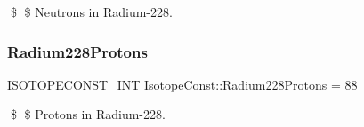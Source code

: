 \$ \$ Neutrons in Radium-\/228. \mbox{\label{group___isotope_const-_radium-_ra228_gae509641c34e64d706c0851ac9124c654}} 
\subsubsection{\texorpdfstring{Radium228\+Protons}{Radium228Protons}}
{\footnotesize\ttfamily \mbox{\hyperlink{group___isotope_const-_macros_ga5f18360b3e99483a35c32d789e62621c}{I\+S\+O\+T\+O\+P\+E\+C\+O\+N\+S\+T\+\_\+\+I\+NT}} Isotope\+Const\+::\+Radium228\+Protons = 88}

\$ \$ Protons in Radium-\/228. 
